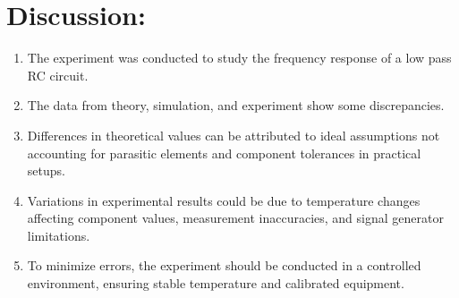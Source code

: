 \documentclass[a4paper, 12pt]{extarticle}
\begin{document}

\section{Discussion:}
\begin{enumerate}
    \item The experiment was conducted to study the frequency response of a low pass RC circuit.
    \item The data from theory, simulation, and experiment show some discrepancies.
    \item Differences in theoretical values can be attributed to ideal assumptions not accounting for parasitic elements and component tolerances in practical setups.
    \item Variations in experimental results could be due to temperature changes affecting component values, measurement inaccuracies, and signal generator limitations.
    \item To minimize errors, the experiment should be conducted in a controlled environment, ensuring stable temperature and calibrated equipment.
\end{enumerate}
\end{document}
